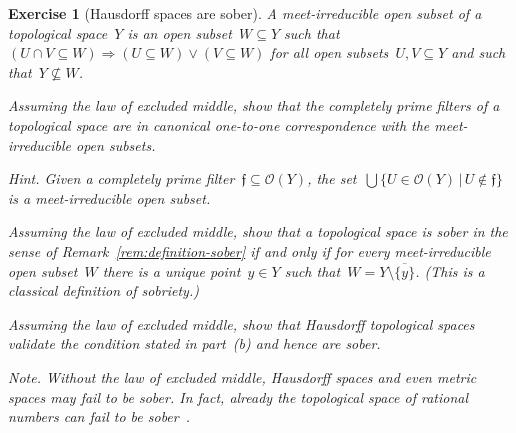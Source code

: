 \documentclass{ws-rv9x6}
\newtheorem{ex}{Exercise}
\newenvironment{exercise}[1]{
  \begin{ex}[#1]
}{\end{ex}}
\renewcommand{\O}{\mathcal{O}}
\newcommand{\fff}{\mathfrak{f}}
\renewcommand{\_}{\mathpunct{.}}
\newcommand{\?}{\,{:}\,}
\begin{document}
\begin{exercise}{Hausdorff spaces are sober}%
\label{ex:hausdorff-sober}%
A \emph{meet-irreducible open subset} of a topological space~$Y$ is an
open subset~$W \subseteq Y$ such that~$(U \cap V \subseteq W) \Rightarrow (U
\subseteq W) \vee (V \subseteq W)$ for all open subsets~$U,V \subseteq Y$ and
such that~$Y \not\subseteq W$.
\begin{alphlist}[(c)]
\item Assuming the law of excluded middle, show that the completely prime
filters of a topological space are in canonical one-to-one correspondence with
the meet-irreducible open subsets.\smallskip

{\scriptsize\emph{Hint.} Given a completely prime filter~$\fff \subseteq
\O(Y)$, the set~$\bigcup\{ U \in \O(Y) \,|\, U \not\in \fff \}$ is a
meet-irreducible open subset.\par}
\item Assuming the law of excluded middle, show that a topological space is
sober in the sense of Remark~\ref{rem:definition-sober} if and only if for
every meet-irreducible open subset~$W$ there is a unique point~$y \in Y$ such
that~$W = Y \setminus \overline{\{y\}}$.
(This is a classical definition of sobriety.)

\item Assuming the law of excluded middle, show that Hausdorff topological
spaces validate the condition stated in part~(b) and hence are sober.
\end{alphlist}
{\scriptsize\emph{Note.} Without the law of excluded middle, Hausdorff spaces
and even metric spaces may fail to be sober. In fact, already the topological
space of rational numbers can fail to be
sober~\cite[Example~8.14(iv)]{fourman-scott:sheaves-and-logic}.\par}
\end{exercise}
\end{document}
